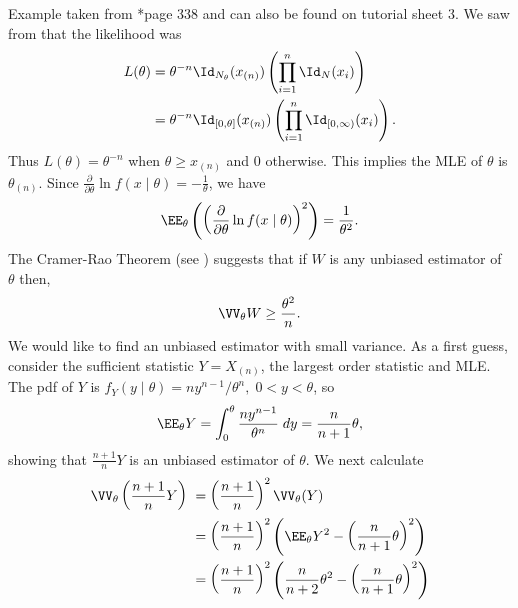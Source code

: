 \begin{exam} \label{exam: uni_ss_p2}
    Example taken from \cite{CasellaGeorge2001SI}*{page 338} and can also be found on tutorial sheet 3. We saw from  that the likelihood was
    \begin{align*}
        L (\theta) & = \theta^{-n} \Id_{N_\theta} (x_{(n)}) \left( \prod_{i=1}^{n} \Id_{N} (x_i) \right)             \\
                   & = \theta^{-n} \Id_{[0,\theta]} (x_{(n)}) \left( \prod_{i=1}^{n} \Id_{[0,\infty)} (x_i) \right).
    \end{align*}
    Thus $L (\theta) = \theta^{-n}$ when $\theta \geq x_{(n)}$ and $0$ otherwise. This implies the MLE of $\theta$ is $\theta_{(n)}$. Since $\frac{\partial}{\partial \theta} \ln f (x \mid \theta) = -\frac{1}{\theta}$, we have
    \begin{equation*}
        \EE_{\theta} \left( \left( \frac{\partial}{\partial \theta} \ln f (x \mid \theta) \right)^2 \right) = \frac{1}{\theta^2}.
    \end{equation*}
    The Cramer-Rao Theorem (see ) suggests that if $W$ is any unbiased estimator of $\theta$ then,
    \begin{equation*}
        \VV_\theta W \geq \frac{\theta^2}{n}.
    \end{equation*}
    We would like to find an unbiased estimator with small variance. As a first guess, consider the sufficient statistic $Y = X_{(n)}$, the largest order statistic and MLE. The pdf of $Y$ is $f_Y (y\mid \theta) = ny^{n-1} / \theta^n, \; 0 < y < \theta$, so
    \begin{equation*}
        \EE_{\theta} Y = \int_{0}^{\theta} \frac{ny^{n-1}}{\theta^n} \; dy = \frac{n}{n+1} \theta,
    \end{equation*}
    showing that $\frac{n+1}{n}Y$ is an unbiased estimator of $\theta$. We next calculate
    \begin{align*}
        \VV_{\theta} \left( \frac{n+1}{n} Y \right) \ 
        & = \left( \frac{n+1}{n} \right)^2 \VV_{\theta} (Y)                                                             \\
        & = \left( \frac{n+1}{n} \right)^2 \left( \EE_{\theta} Y^2 - \left( \frac{n}{n+1} \theta \right)^2 \right)      \\
        & = \left( \frac{n+1}{n} \right)^2 \left( \frac{n}{n+2}\theta^2 - \left( \frac{n}{n+1} \theta \right)^2 \right) \\

\end{align*}
\end{exam}
